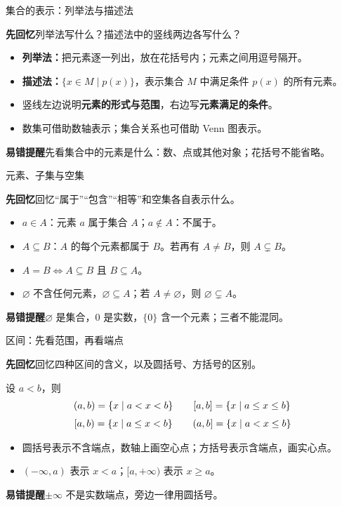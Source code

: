 \documentclass[UTF8,10pt,aspectratio=169,handout]{ctexbeamer}
\newcommand{\Recall}[1]{\par\noindent\textcolor{KnowledgeBlue}{\textbf{先回忆}\quad #1}\par\vspace{0.3cm}}
\newcommand{\Pitfall}[1]{\par\vspace{0.22cm}\noindent\textbf{易错提醒}\quad #1\par}
\begin{document}
\begin{frame}[t]{集合的表示：列举法与描述法}
\large
\Recall{列举法写什么？描述法中的竖线两边各写什么？}
\pause
\begin{itemize}
  \item \textbf{列举法：}把元素逐一列出，放在花括号内；元素之间用逗号隔开。
  \item \textbf{描述法：}$\{x\in M\mid p(x)\}$，表示集合 $M$ 中满足条件 $p(x)$ 的所有元素。
  \item 竖线左边说明\textbf{元素的形式与范围}，右边写\textbf{元素满足的条件}。
  \item 数集可借助数轴表示；集合关系也可借助 Venn 图表示。
\end{itemize}
\Pitfall{先看集合中的元素是什么：数、点或其他对象；花括号不能省略。}
\end{frame}

\begin{frame}[t]{元素、子集与空集}
\large
\Recall{回忆“属于”“包含”“相等”和空集各自表示什么。}
\pause
\begin{itemize}
  \item $a\in A$：元素 $a$ 属于集合 $A$；$a\notin A$：不属于。
  \item $A\subseteq B$：$A$ 的每个元素都属于 $B$。若再有 $A\ne B$，则 $A\subsetneq B$。
  \item $A=B\iff A\subseteq B\text{ 且 }B\subseteq A$。
  \item $\varnothing$ 不含任何元素，$\varnothing\subseteq A$；若 $A\ne\varnothing$，则 $\varnothing\subsetneq A$。
\end{itemize}
\Pitfall{$\varnothing$ 是集合，$0$ 是实数，$\{0\}$ 含一个元素；三者不能混同。}
\end{frame}

\begin{frame}[t]{区间：先看范围，再看端点}
\large
\Recall{回忆四种区间的含义，以及圆括号、方括号的区别。}
\pause
设 $a<b$，则
\[
\begin{array}{c@{\qquad}c}
(a,b)=\{x\mid a<x<b\}&[a,b]=\{x\mid a\le x\le b\}\\[0.22cm]
[a,b)=\{x\mid a\le x<b\}&(a,b]=\{x\mid a<x\le b\}
\end{array}
\]
\begin{itemize}
  \item 圆括号表示不含端点，数轴上画空心点；方括号表示含端点，画实心点。
  \item $(-\infty,a)$ 表示 $x<a$；$[a,+\infty)$ 表示 $x\ge a$。
\end{itemize}
\Pitfall{$\pm\infty$ 不是实数端点，旁边一律用圆括号。}
\end{frame}
\end{document}
